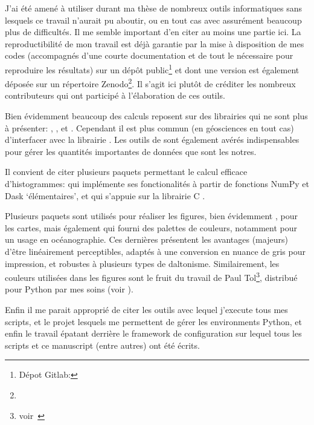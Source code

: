 J'ai été amené à utiliser durant ma thèse de nombreux outils informatiques sans lesquels ce travail n'aurait pu aboutir, ou en tout cas avec assurément beaucoup plus de difficultés.
Il me semble important d'en citer au moins une partie ici.
La reproductibilité de mon travail est déjà garantie par la mise à disposition de mes codes (accompagnés d'une courte documentation et de tout le nécessaire pour reproduire les résultats) sur un dépôt public\footnote{%
  Dépot Gitlab: }
et dont une version est également déposée sur un répertoire Zenodo\footnote{}.
Il s'agit ici plutôt de créditer les nombreux contributeurs qui ont participé à l'élaboration de ces outils.

Bien évidemment beaucoup des calculs reposent sur des librairies qui ne sont plus à présenter: , , et .
Cependant il est plus commun (en géosciences en tout cas) d'interfacer avec la librairie .
Les outils de  sont également avérés indispensables pour gérer les quantités importantes de données que sont les notres.

Il convient de citer plusieurs paquets permettant le calcul efficace d'histogrammes:
 qui implémente ses fonctionalités à partir de fonctions NumPy et Dask \enquote*{élémentaires}, et
 qui s'appuie sur la librairie C .

Plusieurs paquets sont utilisés pour réaliser les figures, bien évidemment ,
 pour les cartes,
mais également  qui fourni des palettes de couleurs, notamment pour un usage en océanographie. Ces dernières présentent les avantages (majeurs) d'être linéairement perceptibles, adaptés à une conversion en nuance de gris pour impression, et robustes à plusieurs types de daltonisme.
Similairement, les couleurs utilisées dans les figures sont le fruit du travail de Paul Tol\footnote{voir~}, distribué pour Python par mes soins (voir ).

Enfin il me parait approprié de citer les outils  avec lequel j'execute tous mes scripts,  et le projet  lesquels me permettent de gérer les environments Python, et enfin le travail épatant derrière le framework de configuration  sur lequel tous les scripts et ce manuscript (entre autres) ont été écrits.
